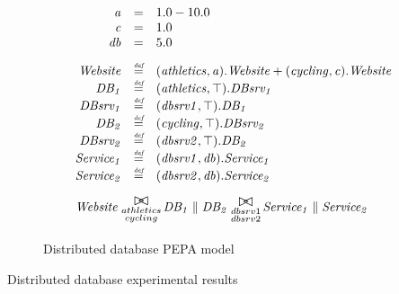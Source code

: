 \begin{figure}
	\caption{Distributed database PEPA model}
	\label{figure:pepa_ddnr_model}
	\centering
	\begin{displaymath}
	\begin{array}{rcl}
	\mathit{a} & = & 1.0-10.0\\
	\mathit{c} & = & 1.0\\
	\mathit{db} & = & 5.0\\
	[2.0ex]		\mathit{Website} & \rmdef & (\mathit{athletics},\mathit{a}).\mathit{Website}+(\mathit{cycling},\mathit{c}).\mathit{Website}\\
	\mathit{DB_1} & \rmdef & (\mathit{athletics},\top).\mathit{DBsrv_1}\\
	\mathit{DBsrv_1} & \rmdef & (\mathit{dbsrv1},\top).\mathit{DB_1}\\
	\mathit{DB_2} & \rmdef & (\mathit{cycling},\top).\mathit{DBsrv_2}\\
	\mathit{DBsrv_2} & \rmdef & (\mathit{dbsrv2},\top).\mathit{DB_2}\\
	\mathit{Service_1} & \rmdef & (\mathit{dbsrv1},\mathit{db}).\mathit{Service_1}\\
	\mathit{Service_2} & \rmdef & (\mathit{dbsrv2},\mathit{db}).\mathit{Service_2}\\
	[2.0ex]		\multicolumn{3}{l}{\mathit{Website}\sync{\substack{athletics\\cycling}}\mathit{DB_1}\parallel\mathit{DB_2}\sync{\substack{dbsrv1\\dbsrv2}}\mathit{Service_1}\parallel\mathit{Service_2}}\\
	[2.0ex]	\end{array}
	\end{displaymath}
\end{figure}

\begin{table}[h!]
	\begin{center}
		\caption{Distributed database experimental results}
		\label{table:ddnr_results}
	\end{center}
\end{table}

